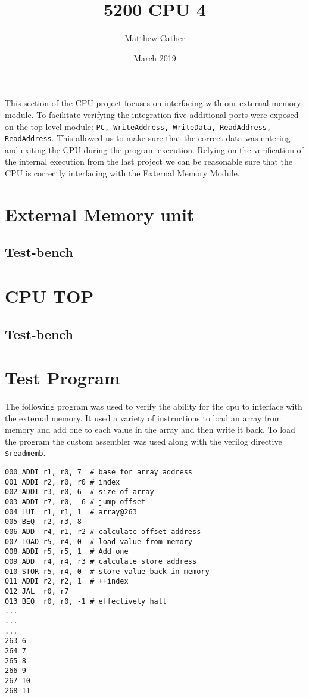 \documentclass{article}
\title{5200 CPU 4}
\author{Matthew Cather}
\date{March 2019}
\begin{document}
\maketitle

This section of the CPU project focuses on interfacing with our external memory module. To facilitate verifying the integration five additional ports were exposed on the top level module: \texttt{PC, WriteAddress, WriteData, ReadAddress, ReadAddress}. This allowed us to make sure that the correct data was entering and exiting the CPU during the program execution. Relying on the verification of the internal execution from the last project we can be reasonable sure that the CPU is correctly interfacing with the External Memory Module.

\tableofcontents
\clearpage

\section{External Memory unit}

\subsection{Test-bench}


\clearpage
\section{CPU TOP}

\subsection{Test-bench}


\clearpage
\section{Test Program}
The following program was used to verify the ability for the cpu to interface with the external memory. It used a variety of instructions to load an array from memory and add one to each value in the array and then write it back. To load the program the custom assembler was used along with the verilog directive \texttt{\$readmemb}.
\begin{lstlisting}
000 ADDI r1, r0, 7  # base for array address
001 ADDI r2, r0, r0 # index
002 ADDI r3, r0, 6  # size of array
003 ADDI r7, r0, -6 # jump offset
004 LUI  r1, r1, 1  # array@263
005 BEQ  r2, r3, 8
006 ADD  r4, r1, r2 # calculate offset address
007 LOAD r5, r4, 0  # load value from memory
008 ADDI r5, r5, 1  # Add one
009 ADD  r4, r4, r3 # calculate store address
010 STOR r5, r4, 0	# store value back in memory
011 ADDI r2, r2, 1  # ++index
012 JAL  r0, r7
013 BEQ  r0, r0, -1 # effectively halt
...
...
...
263 6
264 7
265 8
266 9
267 10
268 11
\end{lstlisting}
\end{document}
